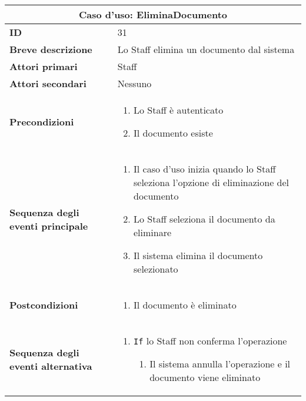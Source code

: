 \documentclass[a4paper]{report}
\begin{document}
\clearpage
\begin{table}[H]
\vspace*{-0cm}
\renewcommand{\arraystretch}{1.9}
\begin{tabular}{|p{3.9cm}|p{9.9cm}|}
\hline
\multicolumn{2}{|c|}{\textbf{Caso d’uso: EliminaDocumento}} \\ \hline
	\textbf{ID} & 31 \\ \hline
	\textbf{Breve descrizione} & Lo Staff elimina un documento dal sistema \\ \hline
	\textbf{Attori primari} & Staff \\ \hline
	\textbf{Attori secondari} & Nessuno \\ \hline
	\textbf{Precondizioni} & \begin{enumerate}[leftmargin=14pt,label=\arabic*.,labelsep=0.5em,topsep=0pt,partopsep=0pt,parsep=0pt,itemsep=0pt]
        \item Lo Staff è autenticato
        \item Il documento esiste
    \end{enumerate} \\ \hline
	\textbf{Sequenza degli eventi principale} & 
\begin{enumerate}[leftmargin=14pt,label=\arabic*.,labelsep=0.5em,topsep=0pt,partopsep=0pt,parsep=0pt,itemsep=0pt]
    \item Il caso d’uso inizia quando lo Staff seleziona l'opzione di eliminazione del documento
    \item Lo Staff seleziona il documento da eliminare
    \item Il sistema elimina il documento selezionato
\end{enumerate}\\ \hline
	\textbf{Postcondizioni} & \begin{enumerate}[leftmargin=14pt,label=\arabic*.,labelsep=0.5em,topsep=0pt,partopsep=0pt,parsep=0pt,itemsep=0pt]
        \item Il documento è eliminato
    \end{enumerate}\\ \hline
	\textbf{Sequenza degli eventi alternativa} & 
\begin{enumerate}[leftmargin=14pt,label=\arabic*.,labelsep=0.5em,topsep=0pt,partopsep=0pt,parsep=0pt,itemsep=0pt]
    \item \texttt{If} lo Staff non conferma l’operazione
    \begin{enumerate}[label=\arabic{enumi}.\arabic*.,leftmargin=22pt,labelsep=0.5em,topsep=0pt,partopsep=0pt,parsep=0pt,itemsep=0pt]
        \item Il sistema annulla l’operazione e il documento viene eliminato
    \end{enumerate}
\end{enumerate} \\ \hline
\end{tabular}
\end{table}
\end{document}
